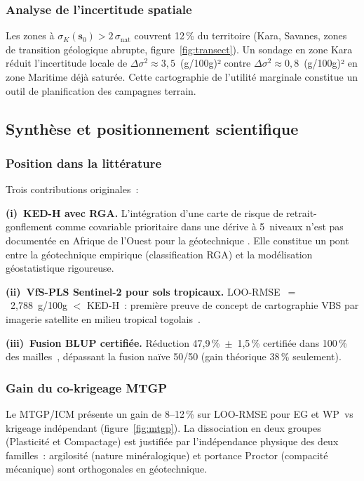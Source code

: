 \documentclass[10pt,a4paper,twocolumn]{article}
\newcommand{\bs}{\mathbf{s}}
\begin{document}
	\subsubsection{Analyse de l'incertitude spatiale}
	
	Les zones à $\sigma_K(\bs_0)>2\,\sigma_{\mathrm{nat}}$ couvrent
	12\,\% du territoire (Kara, Savanes, zones de transition géologique
	abrupte, figure~\ref{fig:transect}).
	Un sondage en zone Kara réduit l'incertitude locale de
	$\Delta\sigma^2\approx3{,}5$~(g/100g)² contre
	$\Delta\sigma^2\approx0{,}8$~(g/100g)² en zone Maritime
	déjà saturée. Cette cartographie de l'utilité marginale constitue
	un outil de planification des campagnes terrain.
	
	\subsection{Synthèse et positionnement scientifique}
	\label{subsec:synthese}
	
	\subsubsection{Position dans la littérature}
	
	Trois contributions originales~:
	
	\textbf{(i)~KED-H avec RGA.}
	L'intégration d'une carte de risque de retrait-gonflement comme
	covariable prioritaire dans une dérive à 5~niveaux n'est pas
	documentée en Afrique de l'Ouest pour la géotechnique
	\cite{odeh1994further}. Elle constitue un pont entre la
	géotechnique empirique (classification RGA) et la modélisation
	géostatistique rigoureuse.
	
	\textbf{(ii)~VfS-PLS Sentinel-2 pour sols tropicaux.}
	LOO-RMSE~$=$~2{,}788~g/100g $<$ KED-H~: première preuve de
	concept de cartographie VBS par imagerie satellite en milieu
	tropical togolais~\cite{viscarra2006data,castaldi2019sentinel}.
	
	\textbf{(iii)~Fusion BLUP certifiée.}
	Réduction 47{,}9\,\%~$\pm$~1{,}5\,\% certifiée dans
	100\,\% des mailles~\cite{chilesdelfiner2012}, dépassant
	la fusion naïve 50/50 (gain théorique 38\,\% seulement).
	
	\subsubsection{Gain du co-krigeage MTGP}
	
	Le MTGP/ICM présente un gain de 8--12\,\% sur LOO-RMSE
	pour EG et WP~vs krigeage indépendant
	(figure~\ref{fig:mtgp}).
	La dissociation en deux groupes (Plasticité et Compactage)
	est justifiée par l'indépendance physique des deux familles~:
	argilosité (nature minéralogique) et portance Proctor
	(compacité mécanique) sont orthogonales en géotechnique.
	
\end{document}
